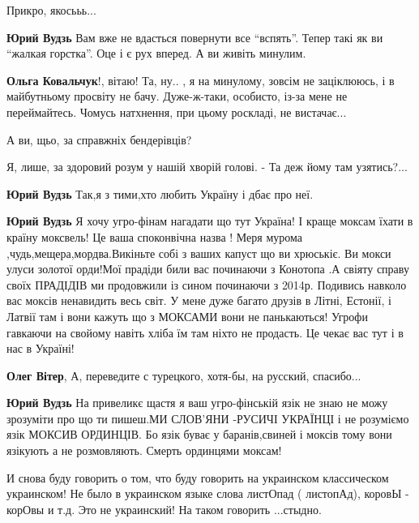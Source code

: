 \begin{itemize}
\begin{itemize}
Прикро, якосььь...

\textbf{Юрий Вудзь} Вам вже не вдасться повернути все \enquote{вспять}. Тепер
такі як ви \enquote{жалкая горстка}. Оце і є рух вперед. А ви живіть минулим.


\textbf{Ольга Ковальчук}!, вітаю!  Та, ну.. , я на минулому, зовсім не заціклююсь, і в
майбутньому просвіту не бачу. Дуже-ж-таки, особисто, із-за мене не
переймайтесь.  Чомусь натхнення, при цьому роскладі, не вистачає...

А ви, щьо, за справжніх бендерівців?

Я, лише, за здоровий розум у нашій хворій голові.
- Та деж йому там узятись?...

\textbf{Юрий Вудзь} Так,я з тими,хто любить Україну і дбає про неї.

\textbf{Юрий Вудзь} Я хочу угро-фінам нагадати що тут Україна! І краще моксам
їхати в країну моксвель! Це ваша споконвічна назва ! Меря мурома
,чудь,мещера,мордва.Викіньте собі з ваших капуст що ви хрюськіє. Ви мокси улуси
золотої орди!Мої прадіди били вас починаючи з Конотопа .А свіяту справу своїх
ПРАДІДІВ ми продовжили із сином починаючи з 2014р. Подивись навколо вас моксів
ненавидить весь світ. У мене дуже багато друзів в Літні, Естонії, і Латвії там
і вони кажуть що з МОКСАМИ вони не панькаються! Угрофи гавкаючи на свойому
навіть хліба їм там ніхто не продасть. Це чекає вас тут і в нас в Україні!

\textbf{Олег Вітер},
А, переведите с турецкого, хотя-бы, на русский, спасибо...

\textbf{Юрий Вудзь} На привеликє щастя я ваш угро-фінській язік не знаю не можу
зрозуміти про що ти пишеш.МИ СЛОВ'ЯНИ -РУСИЧІ УКРАЇНЦІ і не розуміємо язік
МОКСИВ ОРДИНЦІВ. Бо язік буває у баранів,свиней і моксів тому вони язікують а
не розмовляють. Смерть ординцями моксам!
\end{itemize}


И снова буду говорить о том, что буду говорить на украинском классическом
украинском! Не было в украинском языке слова листОпад ( листопАд), коровЫ -
корОвы и т.д. Это не украинский! На таком говорить ...стыдно.

\begin{itemize}


\end{itemize}
\end{itemize}
